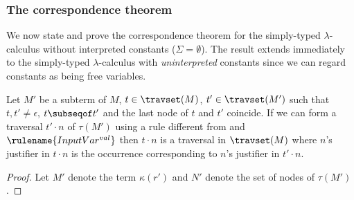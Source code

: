 \subsubsection{The correspondence theorem}
We now state and prove the correspondence theorem for the
simply-typed $\lambda$-calculus without interpreted constants
($\Sigma = \emptyset$). The result extends immediately to the
simply-typed $\lambda$-calculus with \emph{uninterpreted} constants
since we can regard constants as being free variables.

\begin{lemma}
\label{lem:local_traversal_progression}
Let $M'$ be a subterm of $M$, $t \in \travset(M)$,
$t' \in \travset(M')$ such that $t,t' \neq \epsilon$, $t\subseqof t'$
and the last node of $t$ and $t'$ coincide.
If we can form a traversal $t' \cdot n$ of $\tau(M')$ using a rule different from  and $\rulename{InputVar^{val}}$ then
$ t \cdot n$ is a traversal in $\travset(M)$
where $n$'s justifier in $t \cdot n$ is the occurrence corresponding
to $n$'s justifier in $t' \cdot n$.
\end{lemma}
\begin{proof}
  Let $M'$ denote the term $\kappa(r')$ and
  $N'$ denote the set of nodes of $\tau(M')$.

\end{proof}



